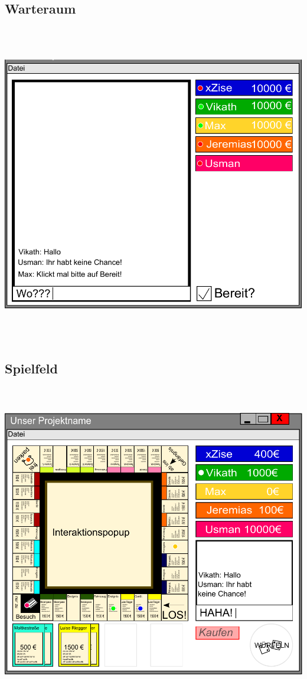 \documentclass[a4paper,10pt]{article}
\begin{document}
\subsection{Warteraum}
\includegraphics[height = 14cm]{warteraum}
\subsection{Spielfeld}
\includegraphics[height = 14cm]{spielfeld}
\end{document}
